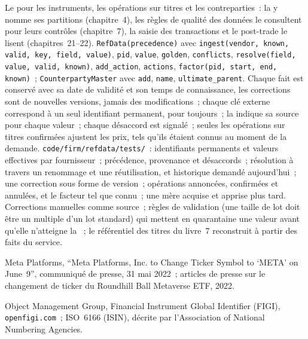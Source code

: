 \begin{build}
 Le  pour les instruments, les opérations sur titres et les contreparties~: la  y nomme ses partitions
(chapitre~4), les règles de qualité des données le consultent pour leurs contrôles (chapitre~7), la saisie des transactions et le post-trade le lisent (chapitres~21--22).
 \texttt{RefData(precedence)} avec \texttt{ingest(vendor, known, valid, key, field, value)}, \texttt{pid},
\texttt{value}, \texttt{golden}, \texttt{conflicts}, \texttt{resolve(field, value, valid, known)}, \texttt{add\_action},
\texttt{actions}, \texttt{factor(pid, start, end, known)}~; \texttt{CounterpartyMaster} avec \texttt{add}, \texttt{name},
\texttt{ultimate\_parent}.
 Chaque fait est conservé avec sa date de validité et son temps de connaissance, les corrections sont de nouvelles versions, jamais des modifications~; chaque
clé externe correspond à un seul identifiant permanent, pour toujours~; la  indique sa source pour chaque valeur~; chaque désaccord est
signalé~; seules les opérations sur titres confirmées ajustent les prix, tels qu'ils étaient connus au moment de la demande.
 \texttt{code/firm/refdata/tests/}~: identifiants permanents et valeurs effectives par fournisseur~; précédence,
provenance et désaccords~; résolution à travers un renommage et une réutilisation, et historique demandé aujourd'hui~; une correction sous forme de version~; opérations
annoncées, confirmées et annulées, et le facteur tel que connu~; une mère acquise et apprise plus tard.
 Corrections manuelles comme source~; règles de validation (une taille de lot doit être un multiple d'un lot standard) qui mettent en quarantaine une
valeur avant qu'elle n'atteigne la ~; le référentiel des titres du livre~7 reconstruit à partir des faits du service.
\end{build}

\begin{omsources}
\item Meta Platforms, ``Meta Platforms, Inc. to Change Ticker Symbol to `META' on June~9'', communiqué de presse, 31 mai 2022~; articles de presse
sur le changement de ticker du Roundhill Ball Metaverse ETF, 2022.
\item Object Management Group, Financial Instrument Global Identifier (FIGI), \texttt{openfigi.com}~; ISO~6166 (ISIN), décrite par
l'Association of National Numbering Agencies.
\end{omsources}

